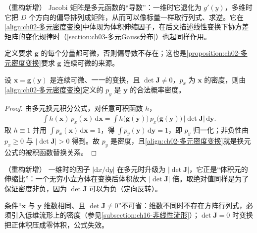 \documentclass[../../main.tex]{subfiles}
\begin{document}
\begin{remark}（重构新增）
Jacobi 矩阵是多元函数的“导数”：一维时它退化为 $g'(y)$，多维时它把 $D$ 个方向的偏导排列成矩阵，从而可以像标量一样取行列式、求逆。它在\eqref{align:ch02-多元密度变换}中体现为体积伸缩因子，在后文描述线性变换下协方差矩阵的变化规律时（\cref{section:ch03-多元Gauss分布}）也起同样作用。

定义要求 $\mathbf{g}$ 的每个分量都可微，否则偏导数不存在；这也是\cref{proposition:ch02-多元密度变换}要求 $\mathbf{g}$ 连续可微的来源。
\end{remark}

\begin{proposition}[多元密度变换公式]\label{proposition:ch02-多元密度变换}
设 $\mathbf{x}=\mathbf{g}(\mathbf{y})$ 是连续可微、一一的变换，且 $\det\mathbf{J}\neq0$，$p_x$ 为 $\mathbf{x}$ 的密度，则由\eqref{align:ch02-多元密度变换}定义的 $p_y$ 是 $\mathbf{y}$ 的合法概率密度。
\end{proposition}

\begin{proof}
由多元换元积分公式，对任意可积函数 $h$，
\begin{align*}
  \int h(\mathbf{x})\,p_x(\mathbf{x})\,\mathrm{d}\mathbf{x}
  = \int h\big(\mathbf{g}(\mathbf{y})\big)\,p_x\big(\mathbf{g}(\mathbf{y})\big)\,\big|\det\mathbf{J}\big|\,\mathrm{d}\mathbf{y} .
\end{align*}
取 $h\equiv1$ 并用 $\int p_x(\mathbf{x})\,\mathrm{d}\mathbf{x}=1$，得 $\int p_y(\mathbf{y})\,\mathrm{d}\mathbf{y}=1$，即 $p_y$ 归一化；非负性由 $p_x\geqslant0$ 与 $|\det\mathbf{J}|>0$ 得到。故 $p_y$ 是密度，且\eqref{align:ch02-多元密度变换}就是换元公式的被积函数替换关系。
\end{proof}

\begin{remark}（重构新增）
一维时的因子 $|\mathrm{d}x/\mathrm{d}y|$ 在多元时升级为 $|\det\mathbf{J}|$，它正是“体积元的伸缩比”：一个无穷小立方体在变换后体积放大 $|\det\mathbf{J}|$ 倍。取绝对值同样是为了保证密度非负，因为 $\det\mathbf{J}$ 可以为负（定向反转）。

条件“$\mathbf{x}$ 与 $\mathbf{y}$ 维数相同、且 $\det\mathbf{J}\neq0$”不可省：维数不同时不存在方阵行列式，必须引入低维流形上的密度（参见\cref{subsection:ch16-非线性流形}）；$\det\mathbf{J}=0$ 时变换把正体积压成零体积，公式失效。
\end{remark}
\end{document}
